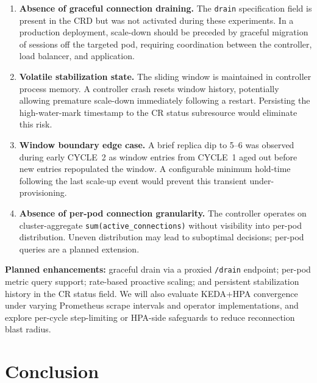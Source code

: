 \documentclass[twocolumn]{svjour3}
\begin{document}
\begin{enumerate}[leftmargin=*]
\item \textbf{Absence of graceful connection draining.} The \texttt{drain} specification field is present in the CRD but was not activated during these experiments. In a production deployment, scale-down should be preceded by graceful migration of sessions off the targeted pod, requiring coordination between the controller, load balancer, and application.

\item \textbf{Volatile stabilization state.} The sliding window is maintained in controller process memory. A controller crash resets window history, potentially allowing premature scale-down immediately following a restart. Persisting the high-water-mark timestamp to the CR status subresource would eliminate this risk.

\item \textbf{Window boundary edge case.} A brief replica dip to 5--6 was observed during early CYCLE~2 as window entries from CYCLE~1 aged out before new entries repopulated the window. A configurable minimum hold-time following the last scale-up event would prevent this transient under-provisioning.

\item \textbf{Absence of per-pod connection granularity.} The controller operates on cluster-aggregate \texttt{sum(active\_connections)} without visibility into per-pod distribution. Uneven distribution may lead to suboptimal decisions; per-pod queries are a planned extension.

\end{enumerate}

\textbf{Planned enhancements:} graceful drain via a proxied \texttt{/drain} endpoint; per-pod metric query support; rate-based proactive scaling; and persistent stabilization history in the CR status field.  We will also evaluate KEDA+HPA convergence under varying Prometheus scrape intervals and operator implementations, and explore per-cycle step-limiting or HPA-side safeguards to reduce reconnection blast radius.

\section{Conclusion}
\label{sec:conclusion}
\end{document}

